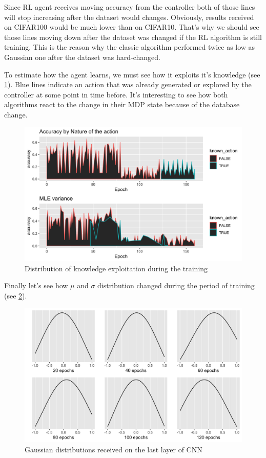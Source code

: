 Since RL agent receives moving accuracy from the controller both of those lines will stop increasing after the dataset would changes. Obviously, results received on CIFAR100 would be much lower than on CIFAR10. That's why we should see those lines moving down after the dataset was changed if the RL algorithm is still training. This is the reason why the classic algorithm performed twice as low as Gaussian one after the dataset was hard-changed.

To estimate how the agent learns, we must see how it exploits it's knowledge (see \ref{fig:actionunique}). Blue lines indicate an action that was already generated or explored by the controller at some point in time before. It's interesting to see how both algorithms react to the change in their MDP state because of the database change.

\begin{figure}[!htb]
  \includegraphics[width=\linewidth]{images/action_unique.png}
  \caption{Distribution of knowledge exploitation during the training}
  \label{fig:actionunique}
\end{figure}

Finally let's see how $\mu$ and $\sigma$ distribution changed during the period of training (see \ref{fig:musigma}).

\begin{figure}[!htb]
  \includegraphics[width=\linewidth]{images/musigma.png}
  \caption{Gaussian distributions received on the last layer of CNN}
  \label{fig:musigma}
\end{figure}

